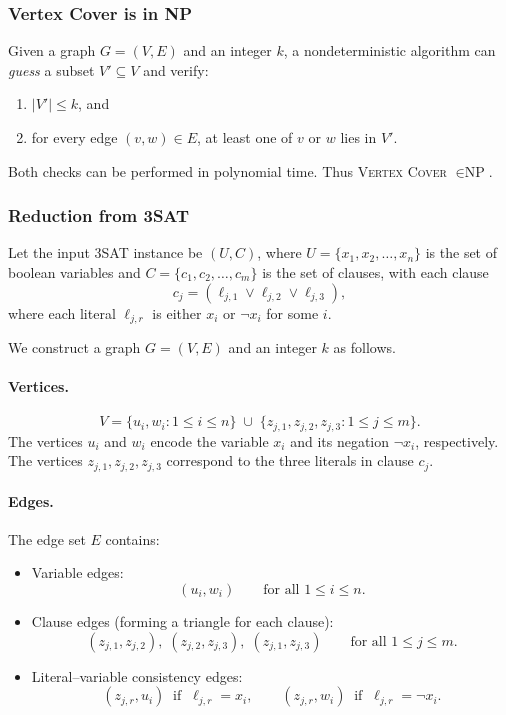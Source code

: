 \documentclass[9pt]{extarticle}
\begin{document}
\subsubsection*{Vertex Cover is in NP}

Given a graph \(G = (V,E)\) and an integer \(k\), a nondeterministic algorithm can
\emph{guess} a subset \(V' \subseteq V\) and verify:
\begin{enumerate}
    \item \(|V'| \le k\), and
    \item for every edge \((v,w) \in E\), at least one of \(v\) or \(w\) lies in \(V'\).
\end{enumerate}
Both checks can be performed in polynomial time.  
Thus \textsc{Vertex Cover} \(\in \text{NP}\).

\subsubsection*{Reduction from 3SAT}

Let the input 3SAT instance be \((U, C)\), where  
\(U = \{x_1, x_2, \dots, x_n\}\) is the set of boolean variables and  
\(C = \{c_1, c_2, \dots, c_m\}\) is the set of clauses, with each clause
\[
c_j = (\ell_{j,1} \lor \ell_{j,2} \lor \ell_{j,3}),
\]
where each literal \(\ell_{j,r}\) is either \(x_i\) or \(\neg x_i\) for some \(i\).

We construct a graph \(G = (V,E)\) and an integer \(k\) as follows.

\paragraph{Vertices.}
\[
V = \{u_i, w_i : 1 \le i \le n\}
    \;\cup\;
    \{z_{j,1}, z_{j,2}, z_{j,3} : 1 \le j \le m\}.
\]
The vertices \(u_i\) and \(w_i\) encode the variable \(x_i\) and its negation \(\neg x_i\), respectively.
The vertices \(z_{j,1}, z_{j,2}, z_{j,3}\) correspond to the three literals in clause \(c_j\).

\paragraph{Edges.}
The edge set \(E\) contains:
\begin{itemize}
    \item Variable edges:
    \[
        (u_i, w_i) \qquad \text{for all } 1 \le i \le n.
    \]
    \item Clause edges (forming a triangle for each clause):
    \[
    (z_{j,1}, z_{j,2}),\;
    (z_{j,2}, z_{j,3}),\;
    (z_{j,1}, z_{j,3})
    \qquad \text{for all } 1 \le j \le m.
    \]
    \item Literal–variable consistency edges:
    \[
    (z_{j,r}, u_i) \;\;\text{if}\;\; \ell_{j,r} = x_i,
    \qquad
    (z_{j,r}, w_i) \;\;\text{if}\;\; \ell_{j,r} = \neg x_i.
    \]
\end{itemize}
\end{document}
